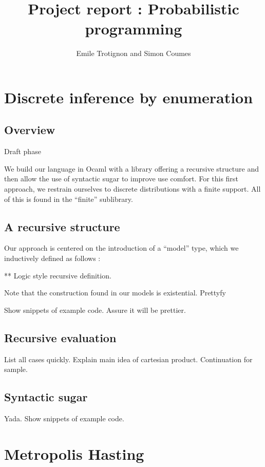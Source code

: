 \documentclass{article}
\title{Project report : Probabilistic programming}
\author{Emile Trotignon and Simon Coumes}
\newcommand\SC[1]{{\color{violet}{\it \bf Simon :} #1}}
\begin{document}
\maketitle

\section{Discrete inference by enumeration}

	\subsection{Overview}

	\SC{Draft phase}

	We build our language in Ocaml with a library offering a recursive structure and then allow the use of syntactic sugar to improve use comfort.
	For this first approach, we restrain ourselves to discrete distributions with a finite support. 
	All of this is found in the ``finite'' sublibrary.

	\subsection{A recursive structure}

	Our approach is centered on the introduction of a ``model'' type, which we inductively defined as follows : 

	  ** Logic style recursive definition. 
	
	Note that the construction found in our models is existential. \SC{Prettyfy}

	Show snippets of example code. Assure it will be prettier.

	\subsection{Recursive evaluation}

	List all cases quickly. Explain main idea of cartesian product. Continuation for sample.	
	\subsection{Syntactic sugar}

	Yada. Show snippets of example code.

\section{Metropolis Hasting}
\end{document}
